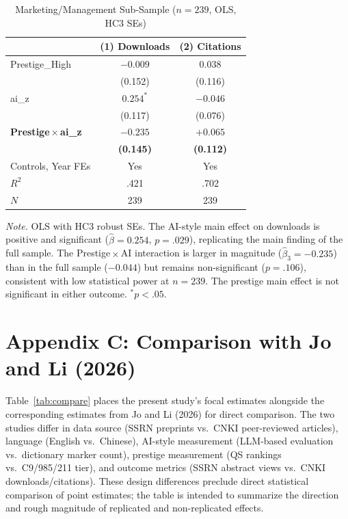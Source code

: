 \documentclass[12pt,a4paper]{article}
\begin{document}
\begin{table}[htbp]
\centering
\caption{Marketing/Management Sub-Sample ($n = 239$, OLS, HC3 SEs)}
\label{tab:mktgmgmt}
\begin{threeparttable}
\small
\begin{tabular}{lcc}
\toprule
 & (1) Downloads & (2) Citations \\
\midrule
Prestige\_High
  & $-0.009$ & $0.038$ \\
  & (0.152)  & (0.116) \\[4pt]
ai\_z
  & $0.254^{*}$ & $-0.046$ \\
  & (0.117)     & (0.076) \\[4pt]
\textbf{Prestige\,$\times$\,ai\_z}
  & $\mathbf{-0.235}$ & $\mathbf{+0.065}$ \\
  & \textbf{(0.145)}  & \textbf{(0.112)}  \\[4pt]
\midrule
Controls, Year FEs & Yes & Yes \\
$R^2$  & .421 & .702 \\
$N$    & 239  & 239  \\
\bottomrule
\end{tabular}
\begin{tablenotes}
\footnotesize
\item \textit{Note.} OLS with HC3 robust SEs.
  The AI-style main effect on downloads is positive and significant
  ($\hat\beta = 0.254$, $p = .029$), replicating the main finding
  of the full sample.
  The Prestige\,$\times$\,AI interaction is larger in magnitude
  ($\hat\beta_3 = -0.235$) than in the full sample ($-0.044$)
  but remains non-significant ($p = .106$), consistent with
  low statistical power at $n = 239$.
  The prestige main effect is not significant in either outcome.
  $^{*}p<.05$.
\end{tablenotes}
\end{threeparttable}
\end{table}

\section*{Appendix C: Comparison with Jo and Li (2026)}

Table~\ref{tab:compare} places the present study's focal estimates
alongside the corresponding estimates from Jo and Li (2026) for
direct comparison.
The two studies differ in data source (SSRN preprints vs.\ CNKI
peer-reviewed articles), language (English vs.\ Chinese),
AI-style measurement (LLM-based evaluation vs.\ dictionary marker count),
prestige measurement (QS rankings vs.\ C9/985/211 tier), and
outcome metrics (SSRN abstract views vs.\ CNKI downloads/citations).
These design differences preclude direct statistical comparison of
point estimates; the table is intended to summarize the direction and
rough magnitude of replicated and non-replicated effects.
\end{document}
